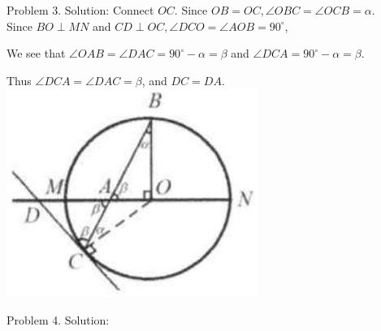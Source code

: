 \documentclass[10pt]{article}
\begin{document}
Problem 3. Solution:
Connect \(O C\). Since \(O B=O C, \angle O B C=\angle O C B=\alpha\).\\
Since \(B O \perp M N\) and \(C D \perp O C, \angle D C O=\angle A O B=90^{\circ}\),

We see that \(\angle O A B=\angle D A C=90^{\circ}-\alpha=\beta\) and \(\angle D C A=90^{\circ}-\alpha=\beta\).

Thus \(\angle D C A=\angle D A C=\beta\), and \(D C=D A\).\\
\includegraphics[max width=\textwidth, center]{2025_04_17_97bc1f7e44d93c271a88g-157(1)}

Problem 4. Solution:
\end{document}
